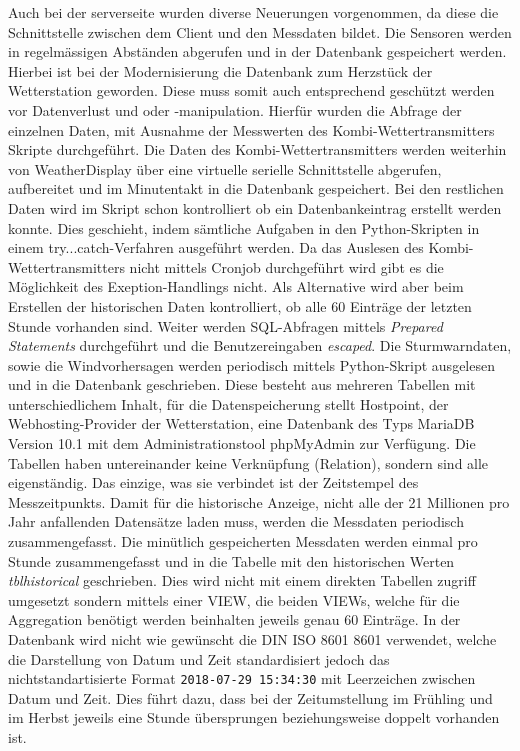 \documentclass[10pt]{article}
\begin{document}
\begin{multicols}{2}
Auch bei der  serverseite wurden diverse Neuerungen vorgenommen, da diese die Schnittstelle zwischen dem Client und den Messdaten bildet. Die Sensoren werden in regelmässigen Abständen abgerufen und in der Datenbank gespeichert werden. Hierbei ist bei der Modernisierung die Datenbank zum Herzstück der Wetterstation geworden. Diese muss somit auch entsprechend geschützt werden vor Datenverlust und oder -manipulation.  Hierfür wurden die Abfrage der einzelnen Daten, mit Ausnahme der Messwerten des Kombi-Wettertransmitters Skripte durchgeführt. Die Daten des Kombi-Wettertransmitters werden weiterhin von WeatherDisplay über eine virtuelle serielle Schnittstelle abgerufen, aufbereitet und im Minutentakt in die Datenbank gespeichert. Bei den restlichen Daten wird im Skript schon kontrolliert ob ein Datenbankeintrag erstellt werden konnte. Dies geschieht, indem sämtliche Aufgaben in den Python-Skripten in einem try...catch-Verfahren ausgeführt werden. Da das Auslesen des Kombi-Wettertransmitters nicht mittels Cronjob durchgeführt wird gibt es die Möglichkeit des Exeption-Handlings nicht. Als Alternative wird aber beim Erstellen der historischen Daten kontrolliert, ob alle 60 Einträge der letzten Stunde vorhanden sind. Weiter werden SQL-Abfragen mittels \emph{Prepared Statements} durchgeführt und die Benutzereingaben \emph{escaped}. Die Sturmwarndaten, sowie die Windvorhersagen werden periodisch mittels Python-Skript ausgelesen und in die Datenbank geschrieben. Diese besteht aus mehreren Tabellen mit unterschiedlichem Inhalt, für die Datenspeicherung stellt Hostpoint, der Webhosting-Provider der Wetterstation, eine Datenbank des Typs MariaDB Version 10.1 mit dem Administrationstool phpMyAdmin zur Verfügung. Die Tabellen haben untereinander keine Verknüpfung (Relation), sondern sind alle eigenständig. Das einzige, was sie verbindet ist der Zeitstempel des Messzeitpunkts. Damit für die historische Anzeige, nicht alle der 21 Millionen pro Jahr anfallenden Datensätze laden muss, werden die Messdaten periodisch zusammengefasst. Die minütlich gespeicherten Messdaten werden einmal pro Stunde zusammengefasst und in die Tabelle mit den historischen Werten \emph{tblhistorical} geschrieben. Dies wird nicht mit einem direkten Tabellen zugriff umgesetzt sondern mittels einer VIEW, die beiden VIEWs, welche für die Aggregation benötigt werden beinhalten jeweils genau 60 Einträge. In der Datenbank wird nicht wie gewünscht die DIN ISO 8601 8601 verwendet, welche die Darstellung von Datum und Zeit standardisiert jedoch das nichtstandartisierte Format \texttt{2018-07-29 15:34:30} mit Leerzeichen zwischen Datum und Zeit. Dies führt dazu, dass bei der Zeitumstellung im Frühling und im Herbst jeweils eine Stunde übersprungen beziehungsweise doppelt vorhanden ist.\\


\end{multicols}
\end{document}
